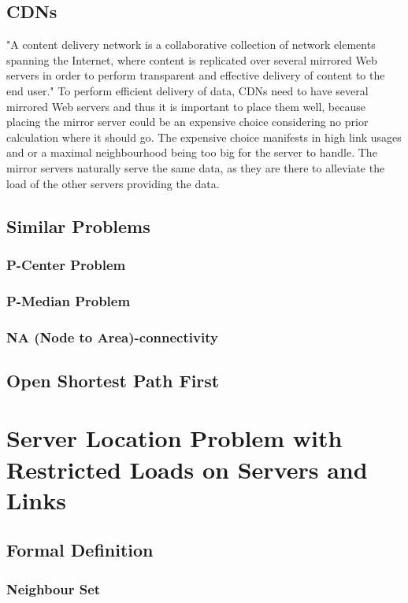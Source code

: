 \documentclass [12pt]{article}
\begin{document}
    \subsection {CDNs}
        "A content delivery network is a collaborative collection of network elements spanning
        the Internet, where content is replicated over several mirrored Web servers in order
        to perform transparent and effective delivery of content to the end user."\cite[p. 3]{Buyya:2008:CDN:1457653}
        To perform efficient delivery of data, CDNs need to have several mirrored Web servers
        and thus it is important to place them well, because placing the mirror server 
        could be an expensive choice considering no prior calculation where it should go. 
        The expensive choice manifests in high link usages and or a maximal neighbourhood being
        too big for the server to handle.
        The mirror servers naturally serve the same data, as they are there to alleviate the 
        load of the other servers providing the data.
        
    \subsection {Similar Problems}
    \subsubsection {P-Center Problem}
    \subsubsection {P-Median Problem}
    \subsubsection {NA (Node to Area)-connectivity}
    \subsection{Open Shortest Path First}
\section{Server Location Problem with Restricted Loads on Servers and Links}
\subsection{Formal Definition}
\subsubsection{Neighbour Set}
\end{document}
